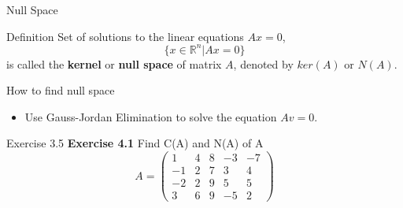 \documentclass[aspectratio=169, UTF8]{ctexbeamer}
\begin{document}
\begin{frame}{Null Space}
    \begin{block}{Definition}
        Set of solutions to the linear equations $Ax=0$,
        \begin{equation*}
            \{x\in\mathbb{R}^n|Ax=0\} 
        \end{equation*}
        is called the \textbf{kernel} or \textbf{null space} of matrix $A$, denoted by $ker(A)$ or $N(A)$.
    \end{block}
    \begin{block}{How to find null space}
        \begin{itemize}
            \item Use Gauss-Jordan Elimination to solve the equation $Av=0$.
        \end{itemize}
    \end{block}
\end{frame}
\begin{frame}{Exercise 3.5}
    \textbf{Exercise 4.1} Find C(A) and N(A) of A
    \begin{equation*}
        A=\begin{pmatrix}
            1&4&8&-3&-7\\
            -1&2&7&3&4\\
            -2&2&9&5&5\\
            3&6&9&-5&2
        \end{pmatrix}
    \end{equation*}
\end{frame}
\end{document}
